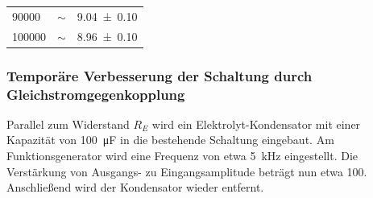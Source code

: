 \begin{center}
\begin{adjustbox}{max width=\linewidth, keepaspectratio}
\begin{tabular}{lll}
            \SI{90000}{}                 & $\sim$                                             & \SI{9,04 \pm 0,10}{}                               \\
            \SI{100000}{}                & $\sim$                                             & \SI{8,96 \pm 0,10}{}                               \\
            \bottomrule
            \end{tabular}
        \end{adjustbox}
        \label{tab:FrequenzgangEmitterschaltung}
    \end{center}
\endminipage
%
\subsubsection*{Temporäre Verbesserung der Schaltung durch Gleichstromgegenkopplung}
%
Parallel zum Widerstand $R_E$ wird ein Elektrolyt-Kondensator mit einer Kapazität von \SI{100}{\micro\farad} in die bestehende Schaltung eingebaut.
Am Funktionsgenerator wird eine Frequenz von etwa \SI{5}{\kilo\hertz} eingestellt.
Die Verstärkung von Ausgangs- zu Eingangsamplitude beträgt nun etwa \SI{100}{}.
Anschließend wird der Kondensator wieder entfernt.
%
